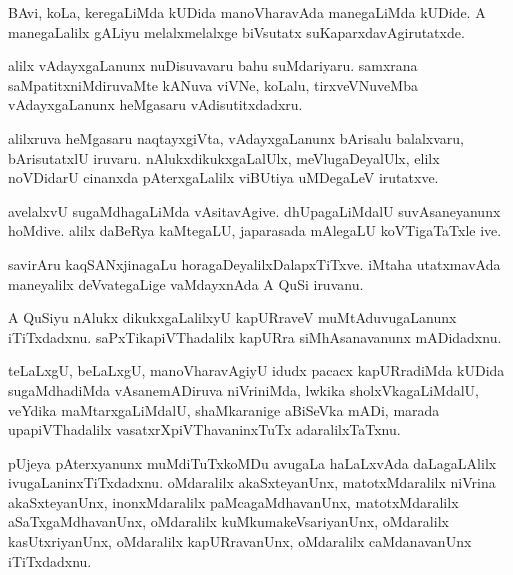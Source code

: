 \documentclass{article}
\begin{document}
\begin{mn}
BAvi,  koLa,  keregaLiMda  kUDida  manoVharavAda  manegaLiMda  kUDide.  A  manegaLalilx  gALiyu  
melalxmelalxge  biVsutatx  suKaparxdavAgirutatxde.
\end{mn}

\begin{mn}
alilx  vAdayxgaLanunx  nuDisuvavaru  bahu  suMdariyaru.  samxrana  saMpatitxniMdiruvaMte  kANuva  
viVNe,  koLalu,  tirxveVNuveMba  vAdayxgaLanunx  heMgasaru  vAdisutitxdadxru.
\end{mn}

\begin{mn}
alilxruva  heMgasaru  naqtayxgiVta,  vAdayxgaLanunx  bArisalu  balalxvaru,  bArisutatxlU  iruvaru.  
nAlukxdikukxgaLalUlx,  meVlugaDeyalUlx,  elilx  noVDidarU  cinanxda  pAterxgaLalilx  viBUtiya  uMDegaLeV  irutatxve.
\end{mn}

\begin{mn}
avelalxvU  sugaMdhagaLiMda  vAsitavAgive.  dhUpagaLiMdalU  suvAsaneyanunx  hoMdive.  alilx  daBeRya  kaMtegaLU,  
japarasada  mAlegaLU  koVTigaTaTxle  ive.
\end{mn}

\begin{mn}
savirAru  kaqSANxjinagaLu  horagaDeyalilxDalapxTiTxve.  iMtaha  utatxmavAda  maneyalilx  deVvategaLige  
vaMdayxnAda  A  QuSi  iruvanu.
\end{mn}

\begin{mn}
A  QuSiyu  nAlukx  dikukxgaLalilxyU  kapURraveV  muMtAduvugaLanunx  iTiTxdadxnu.  saPxTikapiVThadalilx  kapURra  
siMhAsanavanunx  mADidadxnu.
\end{mn}

\begin{mn}
teLaLxgU,  beLaLxgU,  manoVharavAgiyU  idudx  pacacx kapURradiMda  kUDida  sugaMdhadiMda  vAsanemADiruva  
niVriniMda,  lwkika  sholxVkagaLiMdalU,  veYdika  maMtarxgaLiMdalU,  shaMkaranige  aBiSeVka  mADi,  marada  
upapiVThadalilx  vasatxrXpiVThavaninxTuTx  adaralilxTaTxnu.
\end{mn}

\begin{mn}
pUjeya  pAterxyanunx  muMdiTuTxkoMDu  avugaLa  haLaLxvAda  daLagaLAlilx  ivugaLaninxTiTxdadxnu.  
oMdaralilx  akaSxteyanUnx,  matotxMdaralilx  niVrina  akaSxteyanUnx,  inonxMdaralilx  paMcagaMdhavanUnx,  
matotxMdaralilx  aSaTxgaMdhavanUnx,  oMdaralilx  kuMkumakeVsariyanUnx,  oMdaralilx  kasUtxriyanUnx,  
oMdaralilx  kapURravanUnx,  oMdaralilx  caMdanavanUnx  iTiTxdadxnu.
\end{mn}
\end{document}
